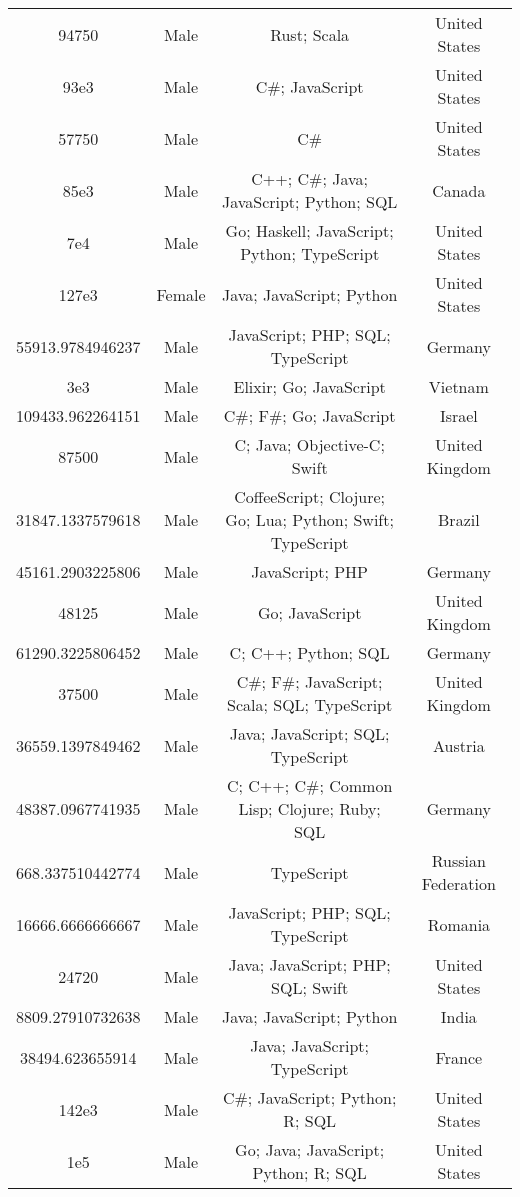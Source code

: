 \begin{center}
\begin{tabular}{ |c|c|c|c| }
94750  &  Male  &  Rust; Scala  &  United States  \\ 
93e3  &  Male  &  C\#; JavaScript  &  United States  \\ 
57750  &  Male  &  C\#  &  United States  \\ 
85e3  &  Male  &  C++; C\#; Java; JavaScript; Python; SQL  &  Canada  \\ 
7e4  &  Male  &  Go; Haskell; JavaScript; Python; TypeScript  &  United States  \\ 
127e3  &  Female  &  Java; JavaScript; Python  &  United States  \\ 
55913.9784946237  &  Male  &  JavaScript; PHP; SQL; TypeScript  &  Germany  \\ 
3e3  &  Male  &  Elixir; Go; JavaScript  &  Vietnam  \\ 
109433.962264151  &  Male  &  C\#; F\#; Go; JavaScript  &  Israel  \\ 
87500  &  Male  &  C; Java; Objective-C; Swift  &  United Kingdom  \\ 
31847.1337579618  &  Male  &  CoffeeScript; Clojure; Go; Lua; Python; Swift; TypeScript  &  Brazil  \\ 
45161.2903225806  &  Male  &  JavaScript; PHP  &  Germany  \\ 
48125  &  Male  &  Go; JavaScript  &  United Kingdom  \\ 
61290.3225806452  &  Male  &  C; C++; Python; SQL  &  Germany  \\ 
37500  &  Male  &  C\#; F\#; JavaScript; Scala; SQL; TypeScript  &  United Kingdom  \\ 
36559.1397849462  &  Male  &  Java; JavaScript; SQL; TypeScript  &  Austria  \\ 
48387.0967741935  &  Male  &  C; C++; C\#; Common Lisp; Clojure; Ruby; SQL  &  Germany  \\ 
668.337510442774  &  Male  &  TypeScript  &  Russian Federation  \\ 
16666.6666666667  &  Male  &  JavaScript; PHP; SQL; TypeScript  &  Romania  \\ 
24720  &  Male  &  Java; JavaScript; PHP; SQL; Swift  &  United States  \\ 
8809.27910732638  &  Male  &  Java; JavaScript; Python  &  India  \\ 
38494.623655914  &  Male  &  Java; JavaScript; TypeScript  &  France  \\ 
142e3  &  Male  &  C\#; JavaScript; Python; R; SQL  &  United States  \\ 
1e5  &  Male  &  Go; Java; JavaScript; Python; R; SQL  &  United States  \\ 

\end{tabular}
\end{center}
